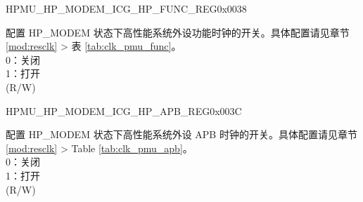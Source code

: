 \begin{register}{H}{PMU\_HP\_MODEM\_ICG\_HP\_FUNC\_REG}{0x0038}\label{regdesc:PMUHPMODEMICGHPFUNCREG}
%
\regnewline%
\begin{regdesc}\begin{reglist}
\label{fielddesc:PMUHPMODEMDIGICGFUNCEN}\item [PMU\_HP\_MODEM\_DIG\_ICG\_FUNC\_EN] 配置 HP\_MODEM 状态下高性能系统外设功能时钟的开关。具体配置请见章节 \ref{mod:resclk} \textit{} > 表 \ref{tab:clk_pmu_func}。 \\
0：关闭\\
1：打开\\
(R/W)
\end{reglist}\end{regdesc}
\end{register}


\begin{register}{H}{PMU\_HP\_MODEM\_ICG\_HP\_APB\_REG}{0x003C}\label{regdesc:PMUHPMODEMICGHPAPBREG}
%
\regnewline%
\begin{regdesc}\begin{reglist}
\label{fielddesc:PMUHPMODEMDIGICGAPBEN}\item [PMU\_HP\_MODEM\_DIG\_ICG\_APB\_EN] 配置 HP\_MODEM 状态下高性能系统外设 APB 时钟的开关。具体配置请见章节 \ref{mod:resclk} \textit{} > Table \ref{tab:clk_pmu_apb}。 \\
0：关闭\\
1：打开\\
(R/W)
\end{reglist}\end{regdesc}
\end{register}



